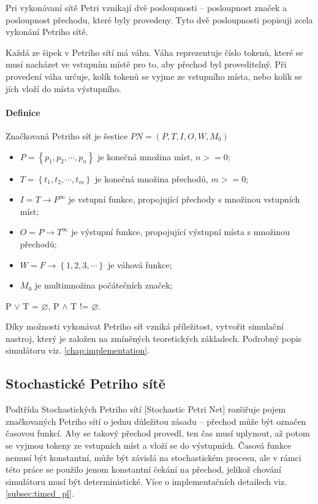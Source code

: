 Pri vykonávaní sítě Petri vznikají dvě posloupnosti -- posloupnost značek a posloupnost přechodu, které byly provedeny. Tyto dvě posloupnosti popisuji zcela vykonání Petriho sítě. \cite[p.18--19]{PNandMoS}

Každá ze šipek v Petriho sítí má váhu. Váha reprezentuje číslo tokenů, které se musí nacházet ve vstupním místě pro to, aby přechod byl proveditelný. Při provedení váha určuje, kolík tokenů se vyjme ze vstupního místa, nebo kolík se jích vloží do místa výstupního.

\paragraph{Definice}

Značkovaná Petriho síť je šestice $PN = \left(P, T, I, O, W, M_0\right)$
\begin{itemize}
  \item $P = \left\{p_1, p_2, \cdots , p_n\right\}$ je konečná množina míst, $n >= 0$; \\
  \item $T = \left\{t_1, t_2, \cdots , t_m\right\}$ je konečná množina přechodů, $m >= 0$; \\
  \item $I = T \rightarrow P^\infty$ je vstupní funkce, propojující přechody s množinou vstupních míst; \\
  \item $O = P \rightarrow T^\infty$ je výstupní funkce, propojující výstupní místa s množinou přechodů; \\
  \item $W = F \rightarrow \left\{1, 2, 3, \cdots \right\}$ je váhová funkce; \\
  \item $M_0$ je multimnožina počátečních značek;
\end{itemize}
P $\vee$ T = $\varnothing$, P $\wedge$ T != $\varnothing$.

Díky možnosti vykonávat Petriho síť vzniká příležitost, vytvořit simulační nastroj, který je založen na zmíněných teoretických základech. Podrobný popis simulátoru viz. \ref{chap:implementation}.

\subsection{Stochastické Petriho sítě}
\label{subsec:timed-pn}

Podtřída Stochastických Petriho sítí [Stochastic Petri Net] rozšiřuje pojem značkovaných Petriho sítí o jednu důležitou zásadu -- přechod může být označen časovou funkcí. Aby se takový přechod provedl, ten čas musí uplynout, až potom se vyjmou tokeny ze vstupních míst a vloží se do výstupních. Časová funkce nemusí být konstantní, může být závislá na stochastickém procesu, ale v rámci této práce se použilo jenom konstantní čekání na přechod, jelikož chování simulátoru musí být deterministické. Více o implementačních detailech viz. \ref{subsec:timed_pl}.

